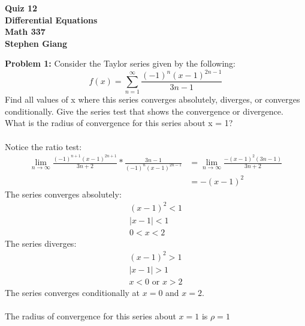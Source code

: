 \documentclass[12pt]{article}
\begin{document}
	
	\begin{center}
		\textbf{Quiz 12} \\
		\textbf{Differential Equations} \\
		\textbf{Math 337} \\
		\textbf{Stephen Giang} \\
	\end{center}

\noindent \textbf{Problem 1: }Consider the Taylor series given by the following:
	$$
	f(x) = \sum_{n = 1}^{\infty} \frac{(-1)^n(x-1)^{2n-1}}{3n-1}
	$$
Find all values of x where this series converges absolutely, diverges, or converges conditionally. Give
the series test that shows the convergence or divergence. What is the radius of convergence for this
series about x = 1?
\\ \\
Notice the ratio test:
	\begin{align*}
		\lim\limits_{n \rightarrow \infty}\frac{(-1)^{n+1}(x-1)^{2n+1}}{3n+2} * \frac{3n-1}{(-1)^n(x-1)^{2n-1}} &= 
		\lim\limits_{n \rightarrow \infty}\frac{-(x-1)^{2}(3n-1)}{3n+2} \\
		&= -(x-1)^{2}
	\end{align*}
The series converges absolutely:
	\begin{align*}
		(x-1)^2 < 1 \\
		|x-1| < 1 \\
		0 < x < 2
	\end{align*}
The series diverges:
	\begin{align*}
		(x-1)^2 > 1 \\
		|x-1| > 1 \\
		x < 0 \text{ or } x > 2
	\end{align*}
The series converges conditionally at $x=0$ and $x=2$.
\\ \\
The radius of convergence for this series about $x=1$ is $\rho = 1$

\newpage 
\end{document}
